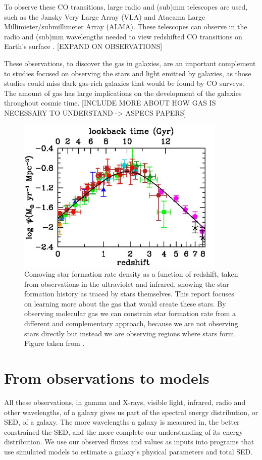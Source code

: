 \documentclass[twoside,single]{lion-msc}
\begin{document}
To observe these CO transitions, large radio and (sub)mm telescopes are used, such as the Jansky Very Large Array (VLA) and Atacama Large Millimieter/submillimeter Array (ALMA). These telescopes can observe in the radio and (sub)mm wavelengths needed to view redshifted CO transitions on Earth's surface \cite{decarli2019alma}. [EXPAND ON OBSERVATIONS]

These observations, to discover the gas in galaxies, are an important complement to studies focused on observing the stars and light emitted by galaxies, as those studies could miss dark gas-rich galaxies that would be found by CO surveys. The amount of gas has large implications on the development of the galaxies throughout cosmic time. [INCLUDE MORE ABOUT HOW GAS IS NECESSARY TO UNDERSTAND -> ASPECS PAPERS]

\begin{figure}[tbp]
\centering \includegraphics[width=100mm]{results_text/figure9a.jpg}
\caption{Comoving star formation rate density as a function of redshift, taken from observations in the ultraviolet and infrared, showing the  star formation history as traced by stars themselves. This report focuses on learning more about the gas that would create these stars. By observing molecular gas we can constrain star formation rate from a different and complementary approach, because we are not observing stars directly but instead we are observing regions where stars form. Figure taken from \cite{madau2014cosmic}.}
\label{fig:SFR_History}
\end{figure}


\section{From observations to models}

All these observations, in gamma and X-rays, visible light, infrared, radio and other wavelengths, of a galaxy gives us part of the spectral energy distribution, or SED, of a galaxy. The more wavelengths a galaxy is measured in, the better constrained the SED, and the more complete our understanding of its energy distribution. We use our observed fluxes and values as inputs into programs that use simulated models to estimate a galaxy's physical parameters and total SED.
\end{document}
